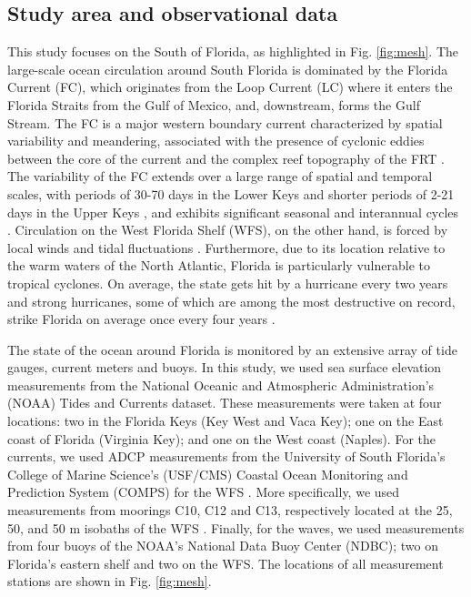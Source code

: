 \documentclass[preprint,12pt,authoryear]{elsarticle}
\begin{document}
\subsection{Study area and observational data}
This study focuses on the South of Florida, as highlighted in Fig. \ref{fig:mesh}. The large-scale ocean circulation around South Florida is dominated by the Florida Current (FC), which originates from the Loop Current (LC) where it enters the Florida Straits from the Gulf of Mexico, and, downstream, forms the Gulf Stream. The FC is a major western boundary current characterized by spatial variability and meandering, associated with the presence of cyclonic eddies between the core of the current and the complex reef topography of the FRT \citep{lee1995florida,kourafalou2012florida}. The variability of the FC extends over a large range of spatial and temporal scales, with periods of 30-70 days in the Lower Keys \citep{lee1995florida} and shorter periods of 2-21 days in the Upper Keys \citep{lee1977low}, and exhibits significant seasonal and interannual cycles \citep{johns1987meandering, lee1988wind,schott1988variability}. Circulation on the West Florida Shelf (WFS), on the other hand, is forced by local winds and tidal fluctuations \citep{lee2002volume,liu2012seasonal}. Furthermore, due to its location relative to the warm waters of the North Atlantic, Florida is particularly vulnerable to tropical cyclones. On average, the state gets hit by a hurricane every two years and strong hurricanes, some of which are among the most destructive on record, strike Florida on average once every four years \citep{malmstadt2009florida}.

The state of the ocean around Florida is monitored by an extensive array of tide gauges, current meters and buoys. In this study, we used sea surface elevation measurements from the National Oceanic and Atmospheric Administration’s (NOAA) Tides and Currents dataset. These measurements were taken at four locations: two in the Florida Keys (Key West and Vaca Key); one on the East coast of Florida (Virginia Key); and one on the West coast (Naples). For the currents, we used ADCP measurements from the University of South Florida's College of Marine Science's (USF/CMS) Coastal Ocean Monitoring and Prediction System (COMPS) for the WFS \citep{weisberg2009mean}. More specifically, we used measurements from moorings C10, C12 and C13, respectively located at the 25, 50, and 50 m isobaths of the WFS \citep{liu2020impacts}. Finally, for the waves, we used measurements from four buoys of the NOAA's National Data Buoy Center (NDBC); two on Florida's eastern shelf and two on the WFS. The locations of all measurement stations are shown in Fig. \ref{fig:mesh}.
\end{document}
